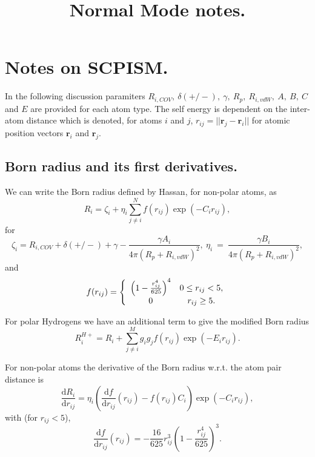 \documentclass[a4paper,11pt,oneside]{article}
\title{Normal Mode notes.}
\begin{document}

\pagebreak
\section*{Notes on SCPISM.}
In the following discussion paramiters
$R_{i,COV},~\delta(+/-),~\gamma,~R_p,~R_{i,vdW},~A,~B,~C$ and $E$
are provided for each atom type. The self energy is dependent on the
inter-atom distance which is denoted, for atoms $i$ and $j$,
$r_{ij}=||\mathbf{r}_j-\mathbf{r}_i||$ for atomic position vectors
$\mathbf{r}_i$ and $\mathbf{r}_j$.

\subsection*{Born radius and its first derivatives.}
We can write the Born radius defined by Hassan, for non-polar atoms,
as
\begin{equation}
R_i = \zeta_i + \eta_i\sum_{j\ne i}^{N}f(r_{ij})\exp(-C_ir_{ij}),
\end{equation}
for
\begin{equation}
\zeta_i = R_{i,COV}+\delta(+/-)+\gamma - \frac{\gamma
A_i}{4\pi(R_p+R_{i,vdW})^2},~\eta_i~=~\frac{\gamma
B_i}{4\pi(R_p+R_{i,vdW})^2},
\end{equation}
and
\begin{equation}
f(r_{ij}) = \left\{
\begin{array}{c c}
\left(1-\frac{r_{ij}^4}{625}\right)^4 & 0\le r_{ij}<5,\\
0 & r_{ij}\ge 5.
\end{array}
\right.
\end{equation}

For polar Hydrogens we have an additional term to give the modified Born radius
\begin{equation}
R_i^{H+} = R_i + \sum_{j\ne i}^M g_ig_jf(r_{ij})\exp(-E_ir_{ij}).
\end{equation}

For non-polar atoms the derivative of the Born radius w.r.t. the
atom pair distance is
\begin{equation}
\frac{\mathrm{d}R_i}{\mathrm{d}r_{ij}} =
\eta_i\left(\frac{\mathrm{d}f}{\mathrm{d}r_{ij}}(r_{ij})-f(r_{ij})C_i\right)\exp(-C_ir_{ij}),
\end{equation}
with (for $r_{ij} < 5$),
\begin{equation}
\frac{\mathrm{d}f}{\mathrm{d}r_{ij}}(r_{ij}) =
-\frac{16}{625}r_{ij}^3\left(1-\frac{r_{ij}^4}{625}\right)^3.
\end{equation}
\end{document}
